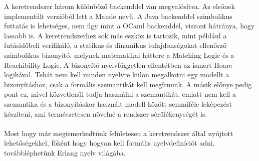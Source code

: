 A keretrendszer három különböző backenddel van megvalósítva. Az elsőnek implementált verzióból lett a Maude nevű. A Java backenddel szimbolikus futtatás is lehetséges, nem úgy mint a OCaml backenddel, viszont hátránya, hogy lassabb is. A keretrendszerhez sok más eszköz is tartozik, mint például a futásidőbeli verifikáló, a statikus és dinamikus tulajdonságokat ellenőrző szimbolikus bizonyító, melynek matematikai háttere a Matching Logic és a Reachibility Logic. A bizonyító nyelvfüggetlen ellentétben az ismert Hoare logikával. Tehát nem kell minden nyelvre külön megalkotni egy modellt a bizonyításhoz, csak a formális szemantikát kell megírnunk. A másik előnye pedig pont ez, mivel közvetlenül tudja használni a szemantikát, emiatt nem kell a szemantika és a bizonyításkor használt modell között semmiféle leképezést készíteni, ami természetesen növelné a rendszer sérülékenységét is.

\paragraph{}
Most hogy már megismerkedtünk felületesen a keretrendszer által nyújtott lehetőségekkel, főként hogy hogyan kell formális nyelvdefiníciót adni, továbbléphetünk Erlang nyelv világába.


